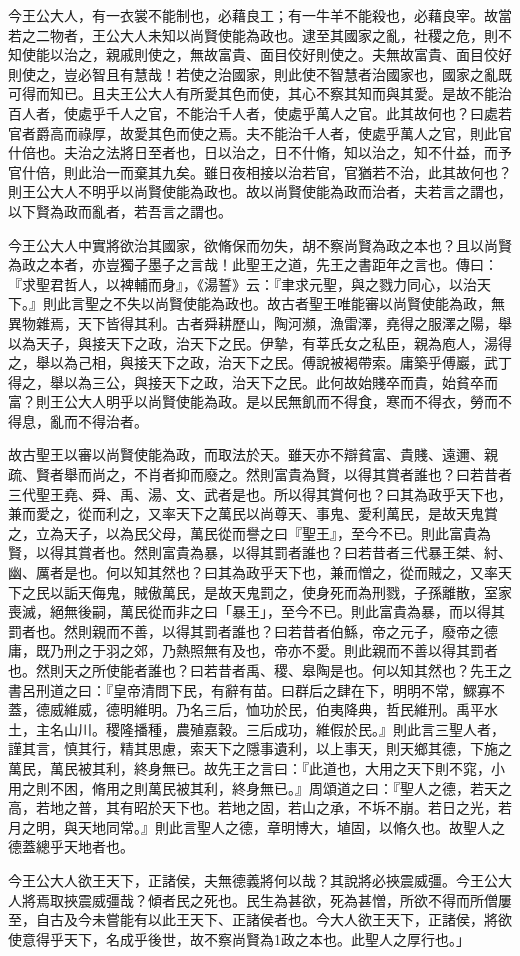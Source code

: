 \begin{pinyinscope}
今王公大人，有一衣裳不能制也，必藉良工；有一牛羊不能殺也，必藉良宰。故當若之二物者，王公大人未知以尚賢使能為政也。逮至其國家之亂，社稷之危，則不知使能以治之，親戚則使之，無故富貴、面目佼好則使之。夫無故富貴、面目佼好則使之，豈必智且有慧哉！若使之治國家，則此使不智慧者治國家也，國家之亂既可得而知已。且夫王公大人有所愛其色而使，其心不察其知而與其愛。是故不能治百人者，使處乎千人之官，不能治千人者，使處乎萬人之官。此其故何也？曰處若官者爵高而祿厚，故愛其色而使之焉。夫不能治千人者，使處乎萬人之官，則此官什倍也。夫治之法將日至者也，日以治之，日不什脩，知以治之，知不什益，而予官什倍，則此治一而棄其九矣。雖日夜相接以治若官，官猶若不治，此其故何也？則王公大人不明乎以尚賢使能為政也。故以尚賢使能為政而治者，夫若言之謂也，以下賢為政而亂者，若吾言之謂也。

今王公大人中實將欲治其國家，欲脩保而勿失，胡不察尚賢為政之本也？且以尚賢為政之本者，亦豈獨子墨子之言哉！此聖王之道，先王之書距年之言也。傳曰：『求聖君哲人，以裨輔而身』，《湯誓》云：『聿求元聖，與之戮力同心，以治天下。』則此言聖之不失以尚賢使能為政也。故古者聖王唯能審以尚賢使能為政，無異物雜焉，天下皆得其利。古者舜耕歷山，陶河瀕，漁雷澤，堯得之服澤之陽，舉以為天子，與接天下之政，治天下之民。伊摯，有莘氏女之私臣，親為庖人，湯得之，舉以為己相，與接天下之政，治天下之民。傅說被褐帶索。庸築乎傅巖，武丁得之，舉以為三公，與接天下之政，治天下之民。此何故始賤卒而貴，始貧卒而富？則王公大人明乎以尚賢使能為政。是以民無飢而不得食，寒而不得衣，勞而不得息，亂而不得治者。

故古聖王以審以尚賢使能為政，而取法於天。雖天亦不辯貧富、貴賤、遠邇、親疏、賢者舉而尚之，不肖者抑而廢之。然則富貴為賢，以得其賞者誰也？曰若昔者三代聖王堯、舜、禹、湯、文、武者是也。所以得其賞何也？曰其為政乎天下也，兼而愛之，從而利之，又率天下之萬民以尚尊天、事鬼、愛利萬民，是故天鬼賞之，立為天子，以為民父母，萬民從而譽之曰『聖王』，至今不已。則此富貴為賢，以得其賞者也。然則富貴為暴，以得其罰者誰也？曰若昔者三代暴王桀、紂、幽、厲者是也。何以知其然也？曰其為政乎天下也，兼而憎之，從而賊之，又率天下之民以詬天侮鬼，賊傲萬民，是故天鬼罰之，使身死而為刑戮，子孫離散，室家喪滅，絕無後嗣，萬民從而非之曰「暴王」，至今不已。則此富貴為暴，而以得其罰者也。然則親而不善，以得其罰者誰也？曰若昔者伯鯀，帝之元子，廢帝之德庸，既乃刑之于羽之郊，乃熱照無有及也，帝亦不愛。則此親而不善以得其罰者也。然則天之所使能者誰也？曰若昔者禹、稷、皋陶是也。何以知其然也？先王之書呂刑道之曰：『皇帝清問下民，有辭有苗。曰群后之肆在下，明明不常，鰥寡不蓋，德威維威，德明維明。乃名三后，恤功於民，伯夷降典，哲民維刑。禹平水土，主名山川。稷隆播種，農殖嘉穀。三后成功，維假於民。』則此言三聖人者，謹其言，慎其行，精其思慮，索天下之隱事遺利，以上事天，則天鄉其德，下施之萬民，萬民被其利，終身無已。故先王之言曰：『此道也，大用之天下則不窕，小用之則不困，脩用之則萬民被其利，終身無已。』周頌道之曰：『聖人之德，若天之高，若地之普，其有昭於天下也。若地之固，若山之承，不坼不崩。若日之光，若月之明，與天地同常。』則此言聖人之德，章明博大，埴固，以脩久也。故聖人之德蓋總乎天地者也。

今王公大人欲王天下，正諸侯，夫無德義將何以哉？其說將必挾震威彊。今王公大人將焉取挾震威彊哉？傾者民之死也。民生為甚欲，死為甚憎，所欲不得而所僧屢至，自古及今未嘗能有以此王天下、正諸侯者也。今大人欲王天下，正諸侯，將欲使意得乎天下，名成乎後世，故不察尚賢為1政之本也。此聖人之厚行也。」


\end{pinyinscope}